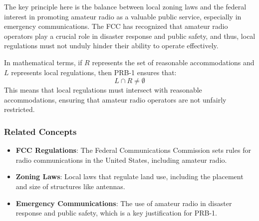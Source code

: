 The key principle here is the balance between local zoning laws and the federal interest in promoting amateur radio as a valuable public service, especially in emergency communications. The FCC has recognized that amateur radio operators play a crucial role in disaster response and public safety, and thus, local regulations must not unduly hinder their ability to operate effectively.

In mathematical terms, if \( R \) represents the set of reasonable accommodations and \( L \) represents local regulations, then PRB-1 ensures that:
\[
L \cap R \neq \emptyset
\]
This means that local regulations must intersect with reasonable accommodations, ensuring that amateur radio operators are not unfairly restricted.

\subsubsection{Related Concepts}
\begin{itemize}
    \item \textbf{FCC Regulations}: The Federal Communications Commission sets rules for radio communications in the United States, including amateur radio.
    \item \textbf{Zoning Laws}: Local laws that regulate land use, including the placement and size of structures like antennas.
    \item \textbf{Emergency Communications}: The use of amateur radio in disaster response and public safety, which is a key justification for PRB-1.
\end{itemize}

